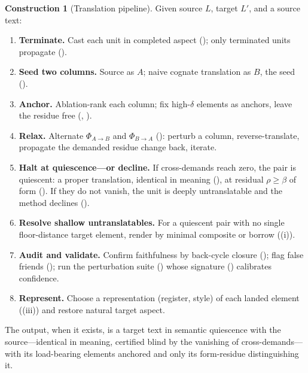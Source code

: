 \documentclass[11pt,a4paper]{article}
\theoremstyle{thmstyle}
\theoremstyle{definition}
\newtheorem{construction}[theorem]{Construction}
\theoremstyle{remark}
\newcommand{\Lang}{L}
\newcommand{\flo}{\beta}               %
\newcommand{\res}{\rho}                %
\newcommand{\abl}{\delta}              %
\newcommand{\colA}{A}                  %
\newcommand{\colB}{B}                  %
\newcommand{\relax}{\Phi}              %
\begin{document}
\begin{construction}[Translation pipeline]
\label{con:pipeline}
Given source $\Lang$, target $\Lang'$, and a source text:
\begin{enumerate}[label=\textup{(\arabic*)},leftmargin=2.6em]
\item \textbf{Terminate.} Cast each unit in completed aspect
(); only terminated units propagate
().
\item \textbf{Seed two columns.} Source as $\colA$; naive cognate translation
as $\colB$, the seed ().
\item \textbf{Anchor.} Ablation-rank each column; fix high-$\abl$ elements as
anchors, leave the residue free (,
).
\item \textbf{Relax.} Alternate $\relax_{\colA\to\colB}$ and
$\relax_{\colB\to\colA}$ (): perturb a column,
reverse-translate, propagate the demanded residue change back, iterate.
\item \textbf{Halt at quiescence---or decline.} If cross-demands reach zero,
the pair is quiescent: a proper translation, identical in meaning
(), at residual $\res\ge\flo$ of form
(). If they do not vanish, the unit is deeply
untranslatable and the method declines ().
\item \textbf{Resolve shallow untranslatables.} For a quiescent pair with no
single floor-distance target element, render by minimal composite or borrow
((i)).
\item \textbf{Audit and validate.} Confirm faithfulness by back-cycle closure
(); flag false friends (); run the
perturbation suite () whose signature
() calibrates confidence.
\item \textbf{Represent.} Choose a representation (register, style) of each
landed element ((iii)) and restore natural target aspect.
\end{enumerate}
The output, when it exists, is a target text in semantic quiescence with the
source---identical in meaning, certified blind by the vanishing of
cross-demands---with its load-bearing elements anchored and only its
form-residue distinguishing it.
\end{construction}
\end{document}
